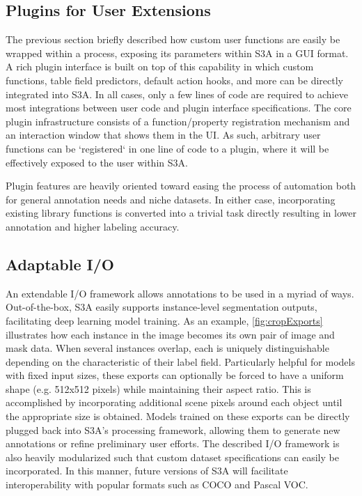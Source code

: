 \makeRegionAnalyticsFig

\subsection{Plugins for User Extensions}\label{sec:plugins}
The previous section briefly described how custom user functions are easily be wrapped within a process, exposing its parameters within S3A in a GUI format. A rich plugin interface is built on top of this capability in which custom functions, table field predictors, default action hooks, and more can be directly integrated into S3A. In all cases, only a few lines of code are required to achieve most integrations between user code and plugin interface specifications. The core plugin infrastructure consists of a function/property registration mechanism and an interaction window that shows them in the UI. As such, arbitrary user functions can be `registered` in one line of code to a plugin, where it will be effectively exposed to the user within S3A.


Plugin features are heavily oriented toward easing the process of automation both for general annotation needs and niche datasets. In either case, incorporating existing library functions is converted into a trivial task directly resulting in lower annotation and higher labeling accuracy.

\subsection{Adaptable I/O}
An extendable I/O framework allows annotations to be used in a myriad of ways. Out-of-the-box, S3A easily supports instance-level segmentation outputs, facilitating deep learning model training. As an example, \autoref{fig:cropExports} illustrates how each instance in the image becomes its own pair of image and mask data. When several instances overlap, each is uniquely distinguishable depending on the characteristic of their label field. Particularly helpful for models with fixed input sizes, these exports can optionally be forced to have a uniform shape (e.g. 512x512 pixels) while maintaining their aspect ratio. This is accomplished by incorporating additional scene pixels around each object until the appropriate size is obtained. Models trained on these exports can be directly plugged back into S3A's processing framework, allowing them to generate new annotations or refine preliminary user efforts. The described I/O framework is also heavily modularized such that custom dataset specifications can easily be incorporated. In this manner, future versions of S3A will facilitate interoperability with popular formats such as COCO and Pascal VOC.

